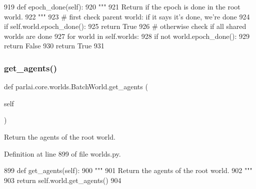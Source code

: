 \begin{DoxyCode}
919     \textcolor{keyword}{def }epoch\_done(self):
920         \textcolor{stringliteral}{"""}
921 \textcolor{stringliteral}{        Return if the epoch is done in the root world.}
922 \textcolor{stringliteral}{        """}
923         \textcolor{comment}{# first check parent world: if it says it's done, we're done}
924         \textcolor{keywordflow}{if} self.world.epoch\_done():
925             \textcolor{keywordflow}{return} \textcolor{keyword}{True}
926         \textcolor{comment}{# otherwise check if all shared worlds are done}
927         \textcolor{keywordflow}{for} world \textcolor{keywordflow}{in} self.worlds:
928             \textcolor{keywordflow}{if} \textcolor{keywordflow}{not} world.epoch\_done():
929                 \textcolor{keywordflow}{return} \textcolor{keyword}{False}
930         \textcolor{keywordflow}{return} \textcolor{keyword}{True}
931 
\end{DoxyCode}
\mbox{\label{classparlai_1_1core_1_1worlds_1_1BatchWorld_a1fc7faff8ccc60606ccff891d36e6b86}} 
\subsubsection{\texorpdfstring{get\+\_\+agents()}{get\_agents()}}
{\footnotesize\ttfamily def parlai.\+core.\+worlds.\+Batch\+World.\+get\+\_\+agents (\begin{DoxyParamCaption}\item[{}]{self }\end{DoxyParamCaption})}

\begin{DoxyVerb}Return the agents of the root world.
\end{DoxyVerb}
 

Definition at line 899 of file worlds.\+py.


\begin{DoxyCode}
899     \textcolor{keyword}{def }get\_agents(self):
900         \textcolor{stringliteral}{"""}
901 \textcolor{stringliteral}{        Return the agents of the root world.}
902 \textcolor{stringliteral}{        """}
903         \textcolor{keywordflow}{return} self.world.get\_agents()
904 
\end{DoxyCode}
\mbox{\label{classparlai_1_1core_1_1worlds_1_1BatchWorld_ab57e642368837b1a9ae79231ee213d46}} 
